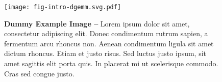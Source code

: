 
\begin{figure}[h]

  \centering
  \texttt{[image: fig-intro-dgemm.svg.pdf]}

  \caption{\textbf{Dummy Example Image --}
    Lorem ipsum dolor sit amet, consectetur adipiscing elit. Donec
    condimentum rutrum sapien, a fermentum arcu rhoncus non. Aenean
    condimentum ligula sit amet dictum rhoncus. Etiam et justo risus. Sed
    luctus justo ipsum, sit amet sagittis elit porta quis. In placerat mi
    ut scelerisque commodo. Cras sed congue justo. }

  \label{fig-intro-dummy}

\end{figure}
